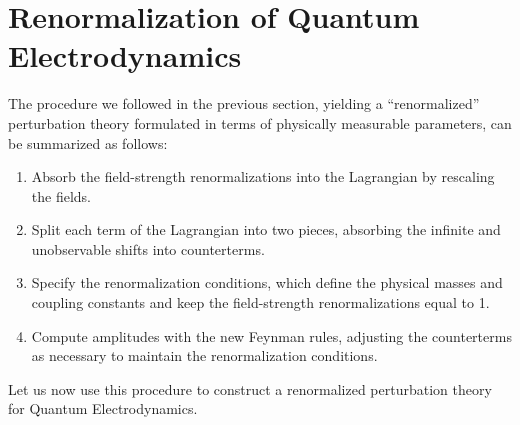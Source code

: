 \section{Renormalization of Quantum Electrodynamics}

The procedure we followed in the previous section, yielding a ``renormalized''
perturbation theory formulated in terms of physically measurable parameters,
can be summarized as follows:
\begin{enumerate}
  \item Absorb the field-strength renormalizations into the Lagrangian by
    rescaling the fields.
  \item Split each term of the Lagrangian into two pieces, absorbing the
    infinite and unobservable shifts into counterterms.
  \item Specify the renormalization conditions, which define the physical
    masses and coupling constants and keep the field-strength renormalizations
    equal to 1.
  \item Compute amplitudes with the new Feynman rules, adjusting the
    counterterms as necessary to maintain the renormalization conditions.
\end{enumerate}
Let us now use this procedure to construct a renormalized perturbation theory
for Quantum Electrodynamics.

